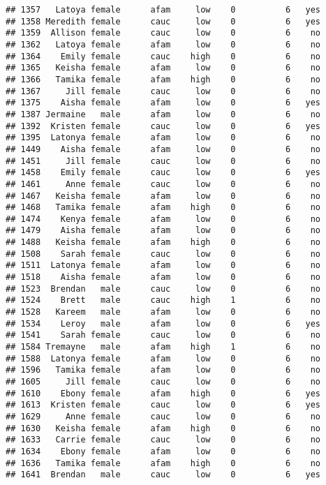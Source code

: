 \documentclass[
]{article}
\begin{document}
\begin{verbatim}
## 1357   Latoya female      afam     low    0          6   yes
## 1358 Meredith female      cauc     low    0          6   yes
## 1359  Allison female      cauc     low    0          6    no
## 1362   Latoya female      afam     low    0          6    no
## 1364    Emily female      cauc    high    0          6    no
## 1365   Keisha female      afam     low    0          6    no
## 1366   Tamika female      afam    high    0          6    no
## 1367     Jill female      cauc     low    0          6    no
## 1375    Aisha female      afam     low    0          6   yes
## 1387 Jermaine   male      afam     low    0          6    no
## 1392  Kristen female      cauc     low    0          6   yes
## 1395  Latonya female      afam     low    0          6    no
## 1449    Aisha female      afam     low    0          6    no
## 1451     Jill female      cauc     low    0          6    no
## 1458    Emily female      cauc     low    0          6   yes
## 1461     Anne female      cauc     low    0          6    no
## 1467   Keisha female      afam     low    0          6    no
## 1468   Tamika female      afam    high    0          6    no
## 1474    Kenya female      afam     low    0          6    no
## 1479    Aisha female      afam     low    0          6    no
## 1488   Keisha female      afam    high    0          6    no
## 1508    Sarah female      cauc     low    0          6    no
## 1511  Latonya female      afam     low    0          6    no
## 1518    Aisha female      afam     low    0          6    no
## 1523  Brendan   male      cauc     low    0          6    no
## 1524    Brett   male      cauc    high    1          6    no
## 1528   Kareem   male      afam     low    0          6    no
## 1534    Leroy   male      afam     low    0          6   yes
## 1541    Sarah female      cauc     low    0          6    no
## 1584 Tremayne   male      afam    high    1          6    no
## 1588  Latonya female      afam     low    0          6    no
## 1596   Tamika female      afam     low    0          6    no
## 1605     Jill female      cauc     low    0          6    no
## 1610    Ebony female      afam    high    0          6   yes
## 1613  Kristen female      cauc     low    0          6   yes
## 1629     Anne female      cauc     low    0          6    no
## 1630   Keisha female      afam    high    0          6    no
## 1633   Carrie female      cauc     low    0          6    no
## 1634    Ebony female      afam     low    0          6    no
## 1636   Tamika female      afam    high    0          6    no
## 1641  Brendan   male      cauc     low    0          6   yes

\end{verbatim}
\end{document}
